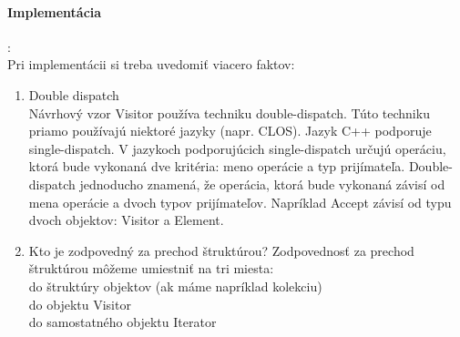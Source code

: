 		\paragraph{Implementácia}:\\
			Pri implementácii si treba uvedomiť viacero faktov:
			\begin{enumerate}
				\item Double dispatch\\
				Návrhový vzor Visitor používa techniku double-dispatch. Túto techniku priamo používajú niektoré jazyky (napr. CLOS). Jazyk C++ podporuje single-dispatch. V jazykoch podporujúcich single-dispatch určujú operáciu, ktorá bude vykonaná dve kritéria: meno operácie a typ prijímateľa. Double-dispatch jednoducho znamená, že operácia, ktorá bude vykonaná závisí od mena operácie a dvoch typov prijímateľov. Napríklad Accept závisí od typu dvoch objektov: Visitor a Element.
				\item Kto je zodpovedný za prechod štruktúrou? Zodpovednosť za prechod štruktúrou môžeme umiestniť na tri miesta:\\
					do štruktúry objektov (ak máme napríklad kolekciu)\\
					do objektu Visitor\\
					do samostatného objektu Iterator
			\end{enumerate}
